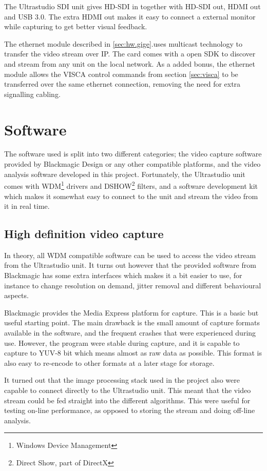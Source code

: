 The Ultrastudio SDI unit gives HD-SDI in together with HD-SDI out, HDMI out and USB 3.0. The 
extra HDMI out makes it easy to connect a external monitor while capturing to get better visual feedback.

The ethernet module described in \autoref{sec:hw.gige}.uses multicast technology to transfer the video stream over IP. The 
card comes with a open SDK to discover and stream from any unit on the local network. As a added bonus, the 
ethernet module allows the VISCA control commands from section \vref{sec:visca} to be transferred over the same 
ethernet connection, removing the need for extra signalling cabling.

\section{Software}
The software used is split into two different categories; the video capture software provided by Blackmagic 
Design or any other compatible platforms, and the video analysis software developed in this project. Fortunately, the Ultrastudio 
unit comes with WDM\footnote{Windows Device Management} drivers and DSHOW\footnote{Direct Show, part of DirectX} 
filters, and a software development kit which makes it somewhat easy to connect to the unit and stream 
the video from it in real time. 

\subsection{High definition video capture}
In theory, all WDM compatible software can be used to access the video stream from the Ultrastudio unit. It turns out
however that the provided software from Blackmagic has some extra interfaces which makes it a bit easier to use, for instance 
to change resolution on demand, jitter removal and different behavioural aspects.

Blackmagic provides the Media Express platform for capture. This is a basic but useful starting point. The main 
drawback is the small amount of capture formats available in the software, and the frequent crashes that were experienced 
during use. However, the program were stable during capture, and it is capable to capture to YUV-8 bit which means almost 
as raw data as possible. This format is also easy to re-encode to other formats at a later stage for storage. 

It turned out that the image processing stack used in the project also were capable to connect directly to the Ultrastudio unit. 
This meant that the video stream could be fed straight into the different algorithms. This were useful for 
testing on-line performance, as opposed to storing the stream and doing off-line analysis.

